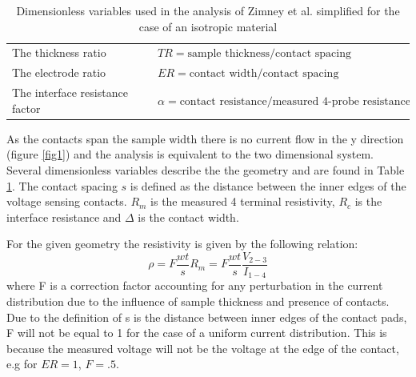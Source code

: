 \begin{table}[b]
\begin{center}
    \begin{tabular}{|l|l|l|  }
    \hline
  
     The thickness ratio & $TR = \text{sample thickness} / \text{contact spacing}$ \\ 
     The electrode ratio & $ER =  \text{contact width}/\text{contact spacing}$ \\ 
     The interface resistance factor & $\alpha = \text{contact resistance} / \text{measured 4-probe resistance}$ \\
     \hline
    \end{tabular}
\end{center}
\caption{Dimensionless variables used in the analysis of Zimney et al. simplified for the case of an isotropic material \cite{Zimney2007CorrectionStudy}}
\label{dimensionless}
\end{table}
 
As the contacts span the sample width there is no current flow in the y direction (figure \ref{fig1}) and the analysis is equivalent to the two dimensional system. Several dimensionless variables describe the the geometry and are found in Table \ref{dimensionless}. The contact spacing $s$ is defined as the distance between the inner edges of the voltage sensing contacts. $R_m$ is the measured 4 terminal resistivity, $R_c$ is the interface resistance and $\Delta$ is the contact width. 

For the given geometry the resistivity is given by the following relation: 
\begin{equation}
    \rho   = F \frac{wt}{s}R_m = F \frac{wt}{s}\frac{V_{2-3}}{I_{1-4}}
\end{equation} 
where F is a correction factor accounting for any perturbation in the current distribution due to the influence of sample thickness and presence of contacts. Due to the definition of s is the distance between inner edges of the contact pads, F will not be equal to 1 for the case of a uniform current distribution. This is because the measured voltage will not be the voltage at the edge of the contact, e.g for $ER = 1$, $F = .5$.


